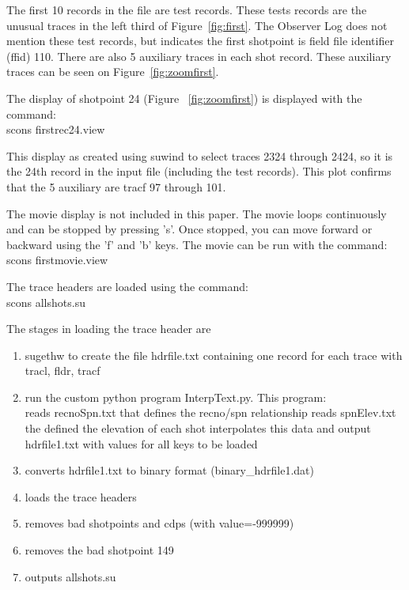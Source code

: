 The first 10 records in the file are test records.  These tests
records are the unusual traces in the left third of
Figure~\ref{fig:first}. The Observer Log does not mention these test
records, but indicates the first shotpoint is field file identifier 
(ffid) 110.  There are also 5 auxiliary traces in each shot record.  
These auxiliary traces can be seen on Figure~\ref{fig:zoomfirst}. 

The display of shotpoint 24 (Figure ~\ref{fig:zoomfirst}) is displayed 
with the command: \\
scons firstrec24.view

This display as created using suwind to select traces 2324 through 2424, 
so it is the 24th record in the input file (including the test records). 
This plot confirms that the 5 auxiliary are tracf 97 through 101.


The movie display is not included in this paper.  The movie loops 
continuously and can be stopped by pressing 's'.  Once stopped, you 
can move forward or backward using the 'f' and 'b' keys.  The movie can be 
run with the command:\\
scons firstmovie.view


The trace headers are loaded using the command:\\
scons allshots.su

The stages in loading the trace header are
\begin{enumerate}
\item sugethw to create the file hdrfile.txt containing one record for 
each trace with tracl, fldr, tracf
\item run the custom python program InterpText.py.  This program:\\
reads recnoSpn.txt that defines the recno/spn relationship
reads spnElev.txt  the defined the elevation of each shot
interpolates this data and output hdrfile1.txt with values for all keys
to be loaded
\item converts hdrfile1.txt to binary format (binary\_hdrfile1.dat)
\item loads the trace headers
\item removes bad shotpoints and cdps (with value=-999999)
\item removes the bad shotpoint 149
\item outputs allshots.su
\end{enumerate}

